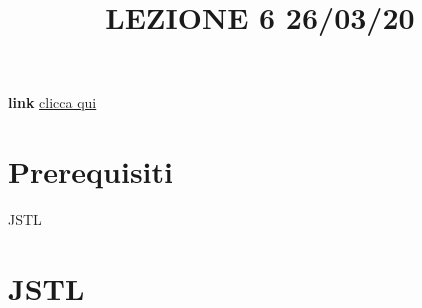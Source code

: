 \title{LEZIONE 6 26/03/20}\newline
\textbf{link} \href{https://web.microsoftstream.com/video/ee54067c-9686-4347-ba02-4b8a9715c174}{clicca qui}
\section*{Prerequisiti}
JSTL
\section{JSTL}
